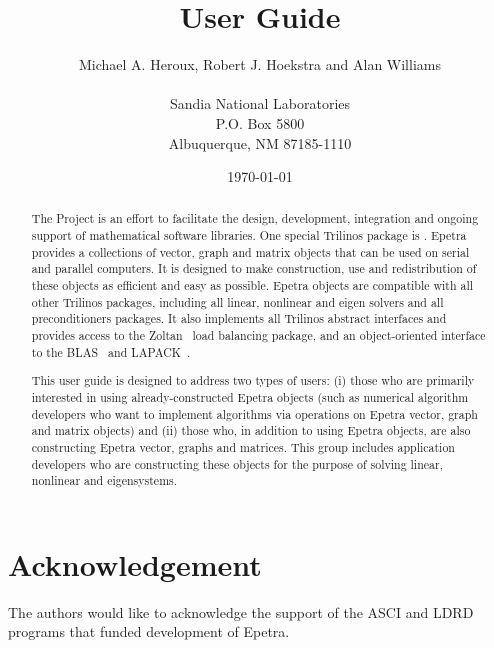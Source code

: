\documentclass[12pt,relax]{EpetraUserGuide}
\title{\EpetraTM{} User Guide}
\author{Michael A. Heroux, Robert J. Hoekstra and Alan Williams \\
	\\
	    Sandia National Laboratories\\
	    P.O. Box 5800\\
	    Albuquerque, NM 87185-1110 
	 }
\date{\today} %
\begin{document}
\maketitle

\begin{abstract}

The \TrilinosTM{} Project is an effort to facilitate the design, development,
integration and ongoing support of mathematical software libraries.
One special Trilinos package is \EpetraTM{}.  Epetra provides a collections of
vector, graph and matrix objects that can be used on serial
and parallel computers.  It is designed to make construction, use and redistribution
of these objects as efficient and easy as possible.  Epetra objects are compatible with all
other Trilinos packages, including all linear, nonlinear and eigen solvers and all
preconditioners packages.  It also implements all Trilinos abstract interfaces and 
provides access to the Zoltan~\cite{zoltan-ug} load balancing package, and an object-oriented
interface to the BLAS~\cite{BLAS1,BLAS2,BLAS3} and LAPACK~\cite{lapack}.


This user guide is designed to address two types of users: 
(i) those who
are primarily interested in using already-constructed Epetra objects (such as 
numerical algorithm developers who want to implement algorithms via 
operations on Epetra vector, graph and matrix objects) and 
(ii) those who, in addition to using Epetra
objects, are also constructing Epetra vector, graphs and matrices.  This group
includes application developers who are constructing these objects for the purpose
of solving linear, nonlinear and eigensystems.

\end{abstract}


\section*{Acknowledgement}
The authors would like to acknowledge the support of the ASCI and LDRD 
programs that funded development of Epetra.

\clearpage
\tableofcontents
\listoffigures
\listoftables

\clearpage
\end{document}
